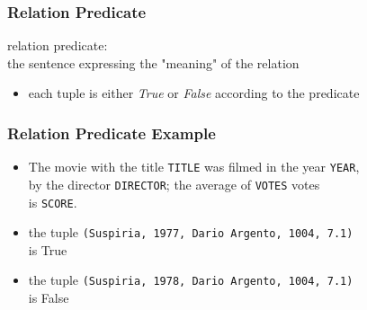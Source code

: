 \documentclass[dvipsnames]{beamer}
\theoremstyle{plain}
\begin{document}
\begin{frame}
  \frametitle{Relation Predicate}

  \begin{definition}
    \alert{relation predicate}:\\
      the sentence expressing the "meaning" of the relation
  \end{definition}

  \begin{itemize}
    \item each tuple is either \emph{True} or \emph{False} according to the
      predicate
  \end{itemize}
\end{frame}

\begin{frame}
  \frametitle{Relation Predicate Example}

  \begin{example}
    \begin{itemize}
      \item The movie with the title \texttt{TITLE} was filmed in the year
	\texttt{YEAR},\\
        by the director \texttt{DIRECTOR}; the average of \texttt{VOTES} votes\\
        is \texttt{SCORE}.

      \pause
      \medskip
      \item the tuple \texttt{(Suspiria, 1977, Dario Argento, 1004, 7.1)}\\
        is True
      \item the tuple \texttt{(Suspiria, 1978, Dario Argento, 1004, 7.1)}\\
        is False
    \end{itemize}
  \end{example}
\end{frame}
\end{document}
